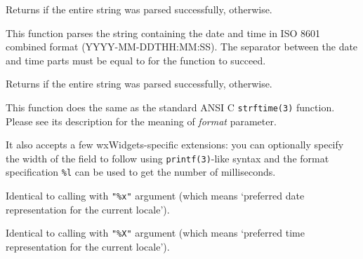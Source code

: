Returns \true if the entire string was parsed successfully, \false otherwise.


\label{wxdatetimeparseisocombined}


This function parses the string containing the date and time in ISO 8601
combined format (YYYY-MM-DDTHH:MM:SS). The separator between the date and time
parts must be equal to  for the function to succeed.

Returns \true if the entire string was parsed successfully, \false otherwise.


\label{wxdatetimeformat}


This function does the same as the standard ANSI C {\tt strftime(3)} function.
Please see its description for the meaning of {\it format} parameter.

It also accepts a few wxWidgets-specific extensions: you can optionally specify
the width of the field to follow using {\tt printf(3)}-like syntax and the
format specification {\tt \%l} can be used to get the number of milliseconds.




\label{wxdatetimeformatdate}


Identical to calling  with {\tt "\%x"}
argument (which means `preferred date representation for the current locale').


\label{wxdatetimeformattime}


Identical to calling  with {\tt "\%X"}
argument (which means `preferred time representation for the current locale').


\label{wxdatetimeformatisocombined}


